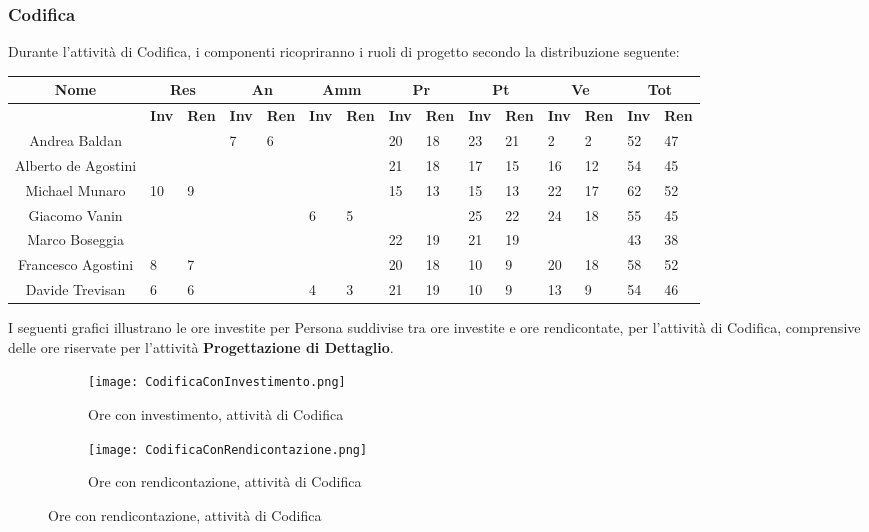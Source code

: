 \documentclass{scalatekids-article}
\begin{document}
\subsubsection{Codifica}
Durante l'attività di Codifica, i componenti ricopriranno i ruoli di progetto secondo la distribuzione seguente:
\begin{center}
  \scriptsize
  \begin{tabular}{| c | p{0.35cm}  p{0.35cm} | p{0.35cm}  p{0.35cm} | p{0.35cm}  p{0.35cm} | p{0.35cm}  p{0.35cm} | p{0.35cm}  p{0.35cm} | p{0.35cm}  p{0.35cm} | p{0.35cm}  p{0.35cm} |}
    \hline
    \textbf{Nome} & \multicolumn{2}{|c|}{\textbf{Res}} & \multicolumn{2}{|c|}{\textbf{An}} & \multicolumn{2}{|c|}{\textbf{Amm}} & \multicolumn{2}{|c|}{\textbf{Pr}} & \multicolumn{2}{|c|}{\textbf{Pt}} & \multicolumn{2}{|c|}{\textbf{Ve}} & \multicolumn{2}{|c|}{\textbf{Tot}}\\
    \hline
    & \textbf{Inv} & \textbf{Ren} & \textbf{Inv} & \textbf{Ren} & \textbf{Inv} & \textbf{Ren} & \textbf{Inv} & \textbf{Ren} & \textbf{Inv} & \textbf{Ren} & \textbf{Inv} & \textbf{Ren} & \textbf{Inv} & \textbf{Ren}\\
    \hline
    Andrea Baldan & & & 7 & 6 & & & 20 & 18 & 23 & 21 & 2 & 2 & 52 & 47\\
    Alberto de Agostini & & & & & & & 21 & 18 & 17 & 15 & 16 & 12 & 54 & 45\\
    Michael Munaro & 10 & 9 & & & & & 15 & 13 & 15 & 13 & 22 & 17 & 62 & 52\\
    Giacomo Vanin & & & & & 6 & 5 & & & 25 & 22 & 24 & 18 & 55 & 45\\
    Marco Boseggia & & & & & & & 22 & 19 & 21 & 19 & & & 43 & 38\\
    Francesco Agostini & 8 & 7 & & & & & 20 & 18 & 10 & 9 & 20 & 18 & 58 & 52\\
    Davide Trevisan & 6 & 6 & & & 4 & 3 & 21 & 19 & 10 & 9 & 13 & 9 & 54 & 46\\
    \hline
  \end{tabular}
\end{center}
\normalsize I seguenti grafici illustrano le ore investite per Persona suddivise
tra ore investite e ore rendicontate, per l'attività di Codifica, comprensive
delle ore riservate per l'attività \textbf{Progettazione di Dettaglio}.
\begin{figure}[H]
  \begin{subfigure}[H]{0.47\textwidth}
    \texttt{[image: CodificaConInvestimento.png]}
    \caption{Ore con investimento, attività di Codifica}
  \end{subfigure}
  \qquad
  \begin{subfigure}[H]{0.47\textwidth}
    \texttt{[image: CodificaConRendicontazione.png]}
    \caption{Ore con rendicontazione, attività di Codifica}
  \end{subfigure}
\end{figure}
\newpage
\end{document}
